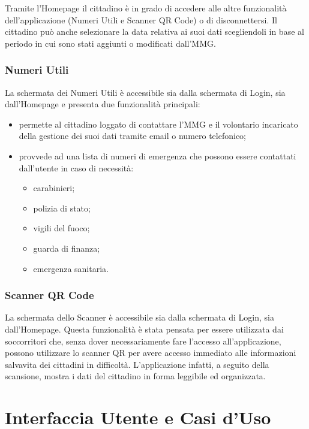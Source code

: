 \documentclass[12pt,a4paper,twoside,openright,titlepage]{book}
\begin{document}
Tramite l'Homepage il cittadino è in grado di accedere alle altre funzionalità dell'applicazione (Numeri Utili e Scanner QR Code) o di disconnettersi. Il cittadino può anche selezionare la data relativa ai suoi dati scegliendoli in base al periodo in cui sono stati aggiunti o modificati dall'MMG.

\subsection{Numeri Utili}
La schermata dei Numeri Utili è accessibile sia dalla schermata di Login, sia dall'Homepage e presenta due funzionalità principali:
\begin{itemize}
\item permette al cittadino loggato di contattare l'MMG e il volontario incaricato della gestione dei suoi dati tramite email o numero telefonico;
\item provvede ad una lista di numeri di emergenza che possono essere contattati dall'utente in caso di necessità:
\begin{itemize}
\item carabinieri;
\item polizia di stato;
\item vigili del fuoco;
\item guarda di finanza;
\item emergenza sanitaria.
\end{itemize}
\end{itemize}

\subsection{Scanner QR Code}
La schermata dello Scanner è accessibile sia dalla schermata di Login, sia dall'Homepage. Questa funzionalità è stata pensata per essere utilizzata dai soccorritori che, senza dover necessariamente fare l'accesso all'applicazione, possono utilizzare lo scanner QR per avere accesso immediato alle informazioni salvavita dei cittadini in difficoltà. L'applicazione infatti, a seguito della scansione, mostra i dati del cittadino in forma leggibile ed organizzata.

\chapter{Interfaccia Utente e Casi d'Uso}
\end{document}
